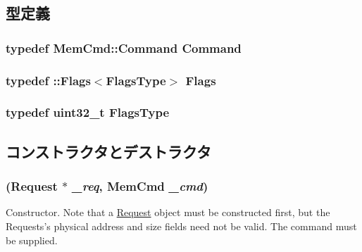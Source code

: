\subsection{型定義}
\hypertarget{classPacket_a1f48acf35af3589c5f137c85deff8e85}{
\subsubsection[{Command}]{\setlength{\rightskip}{0pt plus 5cm}typedef {\bf MemCmd::Command} {\bf Command}}}
\label{classPacket_a1f48acf35af3589c5f137c85deff8e85}
\hypertarget{classPacket_ad6cda6b0b8d7ddfbf8e769082577b482}{
\subsubsection[{Flags}]{\setlength{\rightskip}{0pt plus 5cm}typedef ::{\bf Flags}$<${\bf FlagsType}$>$ {\bf Flags}}}
\label{classPacket_ad6cda6b0b8d7ddfbf8e769082577b482}
\hypertarget{classPacket_a2da503161d95c65aea559dbabcf570aa}{
\subsubsection[{FlagsType}]{\setlength{\rightskip}{0pt plus 5cm}typedef {\bf uint32\_\-t} {\bf FlagsType}}}
\label{classPacket_a2da503161d95c65aea559dbabcf570aa}


\subsection{コンストラクタとデストラクタ}
\hypertarget{classPacket_af96a2c11524631f891fcbd42cf919f53}{
\subsubsection[{Packet}]{ ({\bf Request} $\ast$ {\em \_\-req}, \/  {\bf MemCmd} {\em \_\-cmd})}}
\label{classPacket_af96a2c11524631f891fcbd42cf919f53}
Constructor. Note that a \hyperlink{classRequest}{Request} object must be constructed first, but the Requests's physical address and size fields need not be valid. The command must be supplied. 


